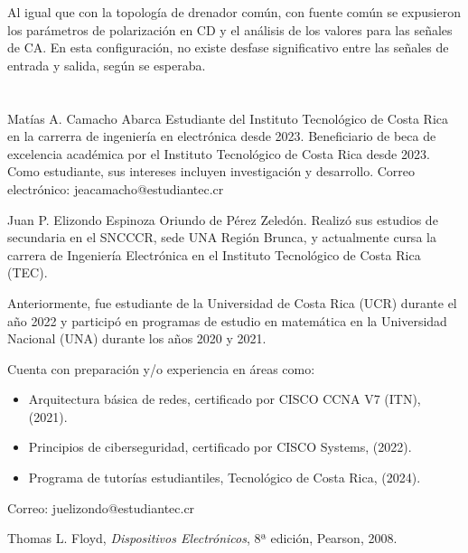 \documentclass[journal]{IEEEtran}
\begin{document}
Al igual que con la topología de drenador común, con fuente común se expusieron los parámetros de polarización en CD
y el análisis de los valores para las señales de CA. En esta configuración, no existe desfase significativo entre las 
señales de entrada y salida, según se esperaba. 
\appendices

\section{}
\vspace{-4.5cm}
\begin{IEEEbiographynophoto}{Matías A. Camacho Abarca}
        Estudiante del Instituto Tecnológico de Costa Rica en la carrerra de ingeniería en electrónica desde
        2023. Beneficiario de beca de excelencia académica por el Instituto Tecnológico de
        Costa Rica desde 2023. Como estudiante, sus
        intereses incluyen investigación y desarrollo.
        Correo electrónico: jeacamacho@estudiantec.cr
\end{IEEEbiographynophoto}
\vspace{-4.8cm}
\begin{IEEEbiographynophoto}{Juan P. Elizondo Espinoza}
        Oriundo de Pérez Zeledón. Realizó sus estudios de secundaria en el SNCCCR, sede UNA Región Brunca, y actualmente cursa la carrera de Ingeniería Electrónica en el Instituto Tecnológico de Costa Rica (TEC). 
        
        Anteriormente, fue estudiante de la Universidad de Costa Rica (UCR) durante el año 2022 y participó en programas de estudio en matemática en la Universidad Nacional (UNA) durante los años 2020 y 2021. 
        
        Cuenta con preparación y/o experiencia en áreas como:
        \begin{itemize}
            \item Arquitectura básica de redes, certificado por CISCO CCNA V7 (ITN), (2021).
            \item Principios de ciberseguridad, certificado por CISCO Systems, (2022).
            \item Programa de tutorías estudiantiles, Tecnológico de Costa Rica, (2024).
        \end{itemize}
        
        Correo: juelizondo@estudiantec.cr
\end{IEEEbiographynophoto}


\begin{thebibliography}{11}
    Thomas L. Floyd, \emph{Dispositivos Electrónicos}, 8ª edición, Pearson, 2008.
\end{thebibliography}
\end{document}
